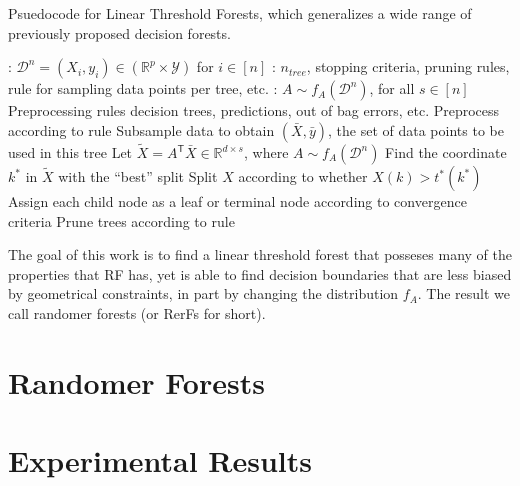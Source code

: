 \documentclass{article}
\newcommand{\Real}{\mathbb{R}}
\providecommand{\mc}[1]{\mathcal{#1}}
\providecommand{\mt}[1]{\widetilde{#1}}
\newcommand{\T}{^{\ensuremath{\mathsf{T}}}}           %
\begin{document}
\begin{algorithm}
  \caption{Psuedocode for Linear Threshold Forests, which generalizes a wide range of previously proposed decision forests.} \label{pseudo}
\begin{algorithmic}[1]
  \algorithmicinput 
  : $\mc{D}^n = (X_i,y_i) \in (\Real^p \times \mc{Y})$ for $i \in [n]$
  :  $n_{tree}$, stopping criteria, pruning rules, rule for sampling data points per tree, etc.
  : $A \sim f_A(\mc{D}^n)$, for all $s \in [n]$
  \State Preprocessing rules
  \algorithmicoutput decision trees, predictions, out of bag errors, etc. 
  \State Preprocess according to rule
  \State Subsample data to obtain $(\bar{X},\bar{y})$, the set of data points to be used in this tree
  \State Let $\mt{X} =  A\T \bar{X} \in \Real^{d \times s}$, where $A \sim f_A(\mc{D}^n)$
  \State Find the coordinate $k^*$ in $\mt{X}$ with the ``best'' split
  \State Split $X$ according to whether $X(k) > t^*(k^*)$
  \State Assign each child node as a leaf or terminal  node according to convergence criteria
  \EndFor
  \EndFor
  \State Prune trees according to rule
\end{algorithmic}
\end{algorithm}

The goal of this work is to find a linear threshold forest that posseses many of the properties that RF has, yet is able to find decision boundaries that are less biased by geometrical constraints, in part by changing the distribution $f_A$. The result we call randomer forests (or RerFs for short).
\section{Randomer Forests}

\section{Experimental Results}
\end{document}
